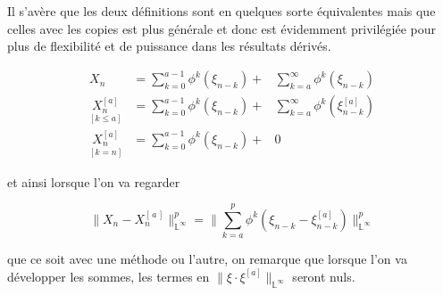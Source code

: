 Il s'avère que les deux définitions sont en quelques sorte \og équivalentes \fg mais que celles avec les copies est plus générale et donc est évidemment privilégiée pour plus de flexibilité et de puissance dans les résultats dérivés.

\begin{align*}
	X_n                               & = \sum\limits_{k=0}^{a-1} \phi^k( \xi_{n-k}) + & \sum\limits_{k=a}^{\infty} \phi^k( \xi_{n-k})
	\\
	\underset {[k\leq a]} {X_n^{[a]}} & = \sum\limits_{k=0}^{a-1} \phi^k( \xi_{n-k}) + & \sum\limits_{k=a}^{\infty} \phi^k( \xi_{n-k}^{[a]})
	\\
	\underset {[k = n]} {X_n^{[a]}}   & = \sum\limits_{k=0}^{a-1} \phi^k( \xi_{n-k}) + & 0
\end{align*}

et ainsi lorsque l'on va regarder

\begin{equation*}
	{\lVert {X_n} - {X_n^{[\, a \, ]}} } \rVert_{{\mathds L} ^\infty}^p= \lVert \sum\limits_{k=a}^p \phi^k( \xi_{n-k} - \xi_{n-k}^{[a]}) \rVert_{{\mathds L} ^\infty}^p
\end{equation*}

\noindent que ce soit avec une méthode ou l'autre, on remarque que lorsque l'on va développer les sommes, les termes en $\lVert{\xi \cdot \xi^{[a]}}\rVert_{\mathds L^\infty}$ seront nuls.

